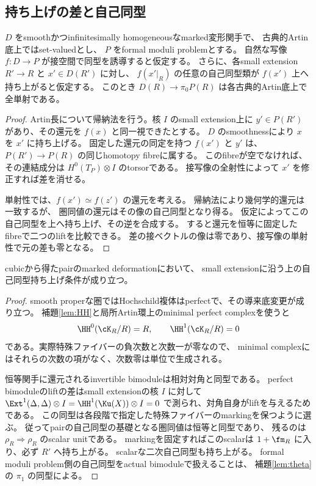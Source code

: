 \subsection{持ち上げの差と自己同型}

\begin{lemma}[Artin帰納法]\label{lem:induction}
 \(D\) をsmoothかつinfinitesimally homogeneousなmarked変形関手で、
 古典的Artin底上ではset-valuedとし、
 \(P\) をformal moduli problemとする。
 自然な写像 \(f:D\to P\) が接空間で同型を誘導すると仮定する。
 さらに、各small extension \(R'\to R\) と \(x'\in D(R')\) に対し、
 \(f(x'\vert_R)\) の任意の自己同型類が \(f(x')\) 上へ持ち上がると仮定する。
 このとき \(D(R)\to\pi_0P(R)\) は各古典的Artin底上で全単射である。
\end{lemma}
\begin{proof}
 Artin長について帰納法を行う。核 \(I\) のsmall extension上に
 \(y'\in P(R')\) があり、その還元を \(f(x)\) と同一視できたとする。
 \(D\) のsmoothnessにより \(x\) を \(x'\) に持ち上げる。
 固定した還元の同定を持つ \(f(x')\) と \(y'\) は、
 \(P(R')\to P(R)\) の同じhomotopy fibreに属する。
 このfibreが空でなければ、その連結成分は
 \(H^0(T_P)\otimes I\) のtorsorである。
 接写像の全射性によって \(x'\) を修正すれば差を消せる。

 単射性では、\(f(x')\simeq f(z')\) の還元を考える。
 帰納法により幾何学的還元は一致するが、
 圏同値の還元はその像の自己同型となり得る。
 仮定によってこの自己同型を上へ持ち上げ、その逆を合成する。
 すると還元を恒等に固定したfibreで二つのliftを比較できる。
 差の接ベクトルの像は零であり、接写像の単射性で元の差も零となる。
\end{proof}

\begin{lemma}\label{lem:automorphisms}
 cubicから得たpairのmarked deformationにおいて、
 small extensionに沿う上の自己同型持ち上げ条件が成り立つ。
\end{lemma}
\begin{proof}
 smooth properな圏ではHochschild複体はperfectで、その導来底変更が成り立つ。
 補題\ref{lem:HH}と局所Artin環上のminimal perfect complexを使うと
 \[
 \HH^0(\cK_R/R)=R,\qquad \HH^1(\cK_R/R)=0
 \]
 である。実際特殊ファイバーの負次数と次数一が零なので、
 minimal complexにはそれらの次数の項がなく、次数零は単位で生成される。

 恒等関手に還元されるinvertible bimoduleは相対対角と同型である。
 perfect bimoduleのliftの差はsmall extensionの核 \(I\) に対して
 \(\Ext^1(\Delta,\Delta)\otimes I=\HH^1(\Ku(X))\otimes I=0\)
 で測られ、対角自身がliftを与えるためである。
 この同型は各段階で指定した特殊ファイバーのmarkingを保つように選ぶ。
 従ってpairの自己同型の基礎となる圏同値は恒等と同型であり、
 残るのは \(\rho_R\Rightarrow\rho_R\) のscalar unitである。
 markingを固定すればこのscalarは \(1+\fm_R\) に入り、必ず \(R'\) へ持ち上がる。
 scalarな二次自己同型も持ち上がる。
 formal moduli problem側の自己同型をactual bimoduleで扱えることは、
 補題\ref{lem:theta}の \(\pi_1\) の同型による。
\end{proof}

